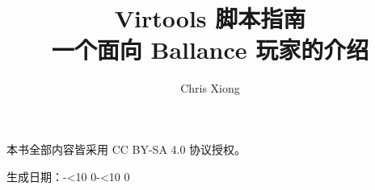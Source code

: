 \documentclass[oneside]{book}
\title{Virtools 脚本指南\\ \large 一个面向 Ballance 玩家的介绍}
\author{Chris Xiong}
\begin{document}
\begin{titlepage}
	\makeatletter
	\centering
	\vspace*{3cm}
	{\huge \@title \par}
	\vspace{1cm}
	{\@author}
	\vfill
	{本书全部内容皆采用 CC BY-SA 4.0 协议授权。\par}
	\def\padd#1{\ifnum #1<10 0\fi\the#1}
	{生成日期：\the\year-\padd\month-\padd\day}
	\vfill
\end{titlepage}
\renewcommand{\contentsname}{目录}
\tableofcontents


\end{document}
